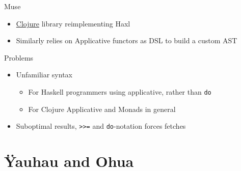 \begin{frame}[fragile]{Muse}

\begin{Shaded}
\begin{Highlighting}[]
\NormalTok{(}\NormalTok{[x y]}
  \NormalTok{(<$> } 

\NormalTok{(}\NormalTok{[x]}
\end{Highlighting}
\end{Shaded}

\begin{itemize}[<+->]
\tightlist
\item
  \href{https://clojure.org}{Clojure} library reimplementing Haxl
\item
  Similarly relies on Applicative functors as DSL to build a custom AST
\end{itemize}

\end{frame}

\begin{frame}[fragile]{Problems}

\pause

\begin{itemize}[<+->]
\tightlist
\item
  Unfamiliar syntax

  \begin{itemize}[<+->]
  \tightlist
  \item
    For Haskell programmers using applicative, rather than \texttt{do}
  \item
    For Clojure Applicative and Monads in general
  \end{itemize}
\item
  Suboptimal results, \texttt{\textgreater{}\textgreater{}=} and
  \texttt{do}-notation forces fetches
\end{itemize}


\end{frame}

\section{Ÿauhau and Ohua}\label{uxffauhau-and-ohua}

